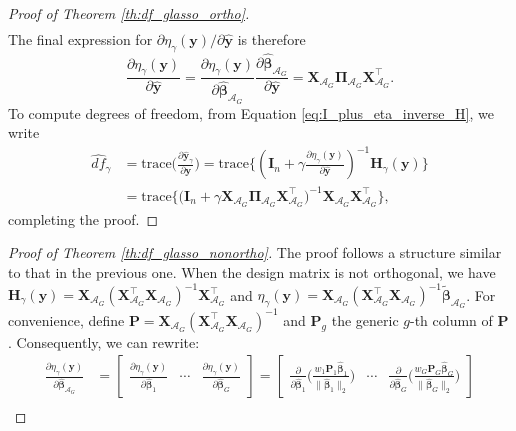 \documentclass[a4paper, 12pt]{article}
\newcommand{\Aset}{\mathcal{A}}
\newcommand{\betahat}{\widehat{\boldsymbol\beta}}
\newcommand{\trace}{\mathrm{trace}}
\newcommand{\T}{\top}
\def\bbeta{\boldsymbol{\beta}}
\def\bPi{\boldsymbol{\Pi}}
\def\by{\boldsymbol{y}}
\def\bH{\mathbf{H}}
\def\bI{\mathbf{I}}
\def\bP{\mathbf{P}}
\def\bX{\mathbf{X}}
\def\by{\mathbf{y}}
\begin{document}
\begin{appendix}
\begin{proof}[Proof of Theorem \ref{th:df_glasso_ortho}]
\begin{equation*}
\begin{aligned}
\end{aligned}
\end{equation*}
The final expression for $\partial\eta_\gamma(\by) / \partial \widehat{\by}$ is therefore
\begin{equation*}
\frac{\partial\eta_\gamma(\by)}{\partial \widehat{\by}}= 
\frac{\partial \eta_\gamma(\by)}{\partial\betahat_{\Aset_G}} \frac{\partial\betahat_{\Aset_G}}{\partial \widehat{\by}}= \bX_{\Aset_G} \bPi_{\Aset_G} \bX_{\Aset_G}^{\T}.
\end{equation*}
To compute degrees of freedom, from Equation \eqref{eq:I_plus_eta_inverse_H}, we write
\begin{equation*}
\begin{aligned}
\widehat{df}_\gamma &= \trace \bigg(\frac{\partial \widehat{\by}_\gamma}{\partial\by} \bigg) = \trace \bigg\{\left(\bI_n+\gamma \frac{\partial\eta_\gamma(\by)}{\partial \widehat{\by}}\right)^{-1} \bH_\gamma(\by) \bigg\}\\
&= \trace \big\{ \big( \bI_n + \gamma \bX_{\Aset_G} \bPi_{\Aset_G} \bX_{\Aset_G}^{\T} \big)^{-1} \bX_{\Aset_G} \bX_{\Aset_G}^{\T}  \big\},
\end{aligned}
\end{equation*}
completing the proof.
\end{proof}
%
\begin{proof}[Proof of Theorem \ref{th:df_glasso_nonortho}]
The proof follows a structure similar to that in the previous one. When the design matrix is not orthogonal, we have $\bH_\gamma(\by) = \bX_{\Aset_G}(\bX_{\Aset_G}^{\T}\bX_{\Aset_G})^{-1}\bX_{\Aset_G}^{\T}$ and  $\eta_\gamma(\by) = \bX_{\Aset_G}\left(\bX_{\Aset_G}^{\T}\bX_{\Aset_G}\right)^{-1}\widetilde{\bbeta}_{\Aset_G}$. For convenience, define $\bP = \bX_{\Aset_G}(\bX_{\Aset_G}^{\T}\bX_{\Aset_G})^{-1}$ and $\bP_g$ the generic $g$-th column of $\bP$. Consequently, we can rewrite:  
\begin{equation*}
\begin{aligned}
\frac{\partial \eta_\gamma(\by)}{\partial\betahat_{\Aset_G}}&= \begin{bmatrix}
\frac{\partial \eta_\gamma(\by)}{\partial\betahat_1} & \cdots&\frac{\partial \eta_\gamma(\by)}{\partial\betahat_G}
\end{bmatrix}= \begin{bmatrix}\frac{\partial}{\partial \betahat_1} \bigg(\frac{ w_1 \bP_1\betahat_1}{\| \betahat_1 \|_2}\bigg)& \cdots &\frac{\partial}{\partial \betahat_G} \bigg(\frac{ w_G \bP_G\betahat_G}{\| \betahat_G \|_2}\bigg) \end{bmatrix} \\

\end{aligned}
\end{equation*}
\end{proof}
\end{appendix}
\end{document}
